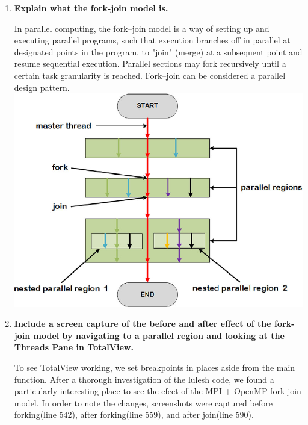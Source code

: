 \documentclass[10pt, letterpaper, twoside]{article}
\begin{document}
\begin{titlepage}
\begin{enumerate}
\item \textbf{Explain what the fork-join model is.}

In parallel computing, the fork–join model is a way of setting up and executing parallel programs, such that execution branches off in parallel at designated points in the program, to "join" (merge) at a subsequent point and resume sequential execution. Parallel sections may fork recursively until a certain task granularity is reached. Fork–join can be considered a parallel design pattern. \\

\hspace{3cm}
\includegraphics[scale = 1.5]{joinfork.png} 

\item \textbf{Include a screen capture of the before and after effect of the fork-join model by navigating to a parallel region and looking at the Threads Pane in TotalView.}

To see TotalView working, we set breakpoints in places aside from the main function. After a thorough investigation of the lulesh code, we found a particularly interesting place to see the efect of the MPI + OpenMP fork-join model. In order to note the changes, screenshots were captured before forking(line 542), after forking(line 559), and after join(line 590).\\


\end{enumerate}
\end{titlepage}
\end{document}
